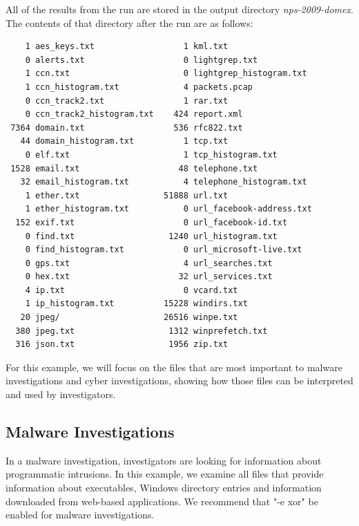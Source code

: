 All of the results from the \bulk run are stored in the output directory \textit{nps-2009-domex}. The contents of that directory after the run are as follows:

\begingroup
\footnotesize
\begin{Verbatim}
    1 aes_keys.txt                  1 kml.txt
    0 alerts.txt                    0 lightgrep.txt
    1 ccn.txt                       0 lightgrep_histogram.txt
    1 ccn_histogram.txt             4 packets.pcap
    0 ccn_track2.txt                1 rar.txt
    0 ccn_track2_histogram.txt    424 report.xml
 7364 domain.txt                  536 rfc822.txt
   44 domain_histogram.txt          1 tcp.txt
    0 elf.txt                       1 tcp_histogram.txt
 1528 email.txt                    48 telephone.txt
   32 email_histogram.txt           4 telephone_histogram.txt
    1 ether.txt                 51888 url.txt
    1 ether_histogram.txt           0 url_facebook-address.txt
  152 exif.txt                      0 url_facebook-id.txt
    0 find.txt                   1240 url_histogram.txt
    0 find_histogram.txt            0 url_microsoft-live.txt
    0 gps.txt                       4 url_searches.txt
    0 hex.txt                      32 url_services.txt
    4 ip.txt                        0 vcard.txt
    1 ip_histogram.txt          15228 windirs.txt
   20 jpeg/                     26516 winpe.txt
  380 jpeg.txt                   1312 winprefetch.txt
  316 json.txt                   1956 zip.txt
\end{Verbatim}
\endgroup
For this example, we will focus on the files that are most important to malware investigations and cyber investigations, showing how those files can be interpreted and used by investigators.

\subsection{Malware Investigations}
In a malware investigation, investigators are looking for information about programmatic intrusions. In this example, we examine all files that provide information about executables, Windows directory entries and information downloaded from web-based applications. We recommend that "-e xor" be enabled for malware investigations.\\

